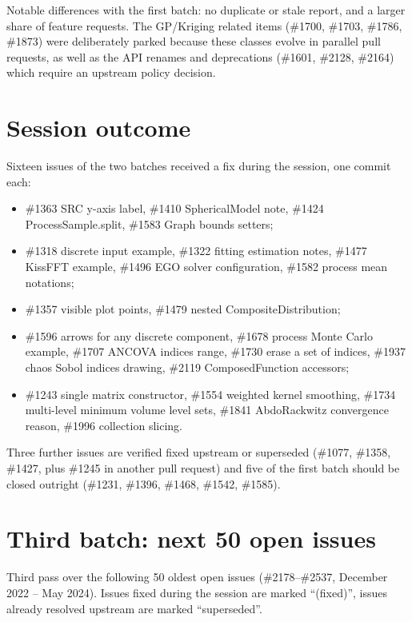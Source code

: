 \documentclass[a4paper,11pt]{article}
\begin{document}
Notable differences with the first batch: no duplicate or stale report,
and a larger share of feature requests. The GP/Kriging related items
(\#1700, \#1703, \#1786, \#1873) were deliberately parked because these
classes evolve in parallel pull requests, as well as the API renames
and deprecations (\#1601, \#2128, \#2164) which require an upstream
policy decision.

\section{Session outcome}

Sixteen issues of the two batches received a fix during the session,
one commit each:

\begin{itemize}[noitemsep]
  \item \#1363 SRC y-axis label, \#1410 SphericalModel note, \#1424
        ProcessSample.split, \#1583 Graph bounds setters;
  \item \#1318 discrete input example, \#1322 fitting estimation notes,
        \#1477 KissFFT example, \#1496 EGO solver configuration,
        \#1582 process mean notations;
  \item \#1357 visible plot points, \#1479 nested CompositeDistribution;
  \item \#1596 arrows for any discrete component, \#1678 process Monte
        Carlo example, \#1707 ANCOVA indices range, \#1730 erase a set
        of indices, \#1937 chaos Sobol indices drawing,
        \#2119 ComposedFunction accessors;
  \item \#1243 single matrix constructor, \#1554 weighted kernel
        smoothing, \#1734 multi-level minimum volume level sets,
        \#1841 AbdoRackwitz convergence reason, \#1996 collection
        slicing.
\end{itemize}

Three further issues are verified fixed upstream or superseded
(\#1077, \#1358, \#1427, plus \#1245 in another pull request) and five
of the first batch should be closed outright (\#1231, \#1396, \#1468,
\#1542, \#1585).


\section{Third batch: next 50 open issues}

Third pass over the following 50 oldest open issues (\#2178--\#2537,
December 2022 -- May 2024). Issues fixed during the session are marked
``(fixed)'', issues already resolved upstream are marked ``superseded''.
\end{document}
